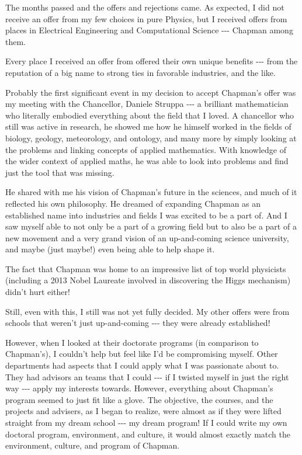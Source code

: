 \documentclass[]{article}
\begin{document}
The months passed and the offers and rejections came. As expected, I did not
receive an offer from my few choices in pure Physics, but I received offers from
places in Electrical Engineering and Computational Science -\/-\/- Chapman among
them.

Every place I received an offer from offered their own unique benefits -\/-\/-
from the reputation of a big name to strong ties in favorable industries, and
the like.

Probably the first significant event in my decision to accept Chapman's offer
was my meeting with the Chancellor, Daniele Struppa -\/-\/- a brilliant
mathematician who literally embodied everything about the field that I loved. A
chancellor who still was active in research, he showed me how he himself worked
in the fields of biology, geology, meteorology, and ontology, and many more by
simply looking at the problems and linking concepts of applied mathematics. With
knowledge of the wider context of applied maths, he was able to look into
problems and find just the tool that was missing.

He shared with me his vision of Chapman's future in the sciences, and much of it
reflected his own philosophy. He dreamed of expanding Chapman as an established
name into industries and fields I was excited to be a part of. And I saw myself
able to not only be a part of a growing field but to also be a part of a new
movement and a very grand vision of an up-and-coming science university, and
maybe (just maybe!) even being able to help shape it.

The fact that Chapman was home to an impressive list of top world physicists
(including a 2013 Nobel Laureate involved in discovering the Higgs mechanism)
didn't hurt either!

Still, even with this, I still was not yet fully decided. My other offers were
from schools that weren't just up-and-coming -\/-\/- they were already
established!

However, when I looked at their doctorate programs (in comparison to Chapman's),
I couldn't help but feel like I'd be compromising myself. Other departments had
aspects that I could apply what I was passionate about to. They had advisors an
teams that I could -\/-\/- if I twisted myself in just the right way -\/-\/-
apply my interests towards. However, everything about Chapman's program seemed
to just fit like a glove. The objective, the courses, and the projects and
advisers, as I began to realize, were almost as if they were lifted straight
from my dream school -\/-\/- my dream program! If I could write my own doctoral
program, environment, and culture, it would almost exactly match the
environment, culture, and program of Chapman.
\end{document}
